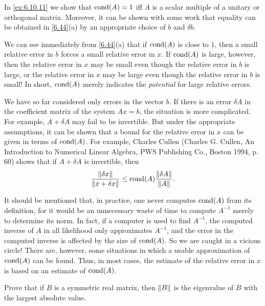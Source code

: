 \begin{note}
  In \cref{ex:6.10.11} we show that \(\cond{A} = 1\) iff \(A\) is a scalar multiple of a unitary or orthogonal matrix.
  Moreover, it can be shown with some work that equality can be obtained in \cref{6.44}(a) by an appropriate choice of \(b\) and \(\delta b\).

  We can see immediately from \cref{6.44}(a) that if \(\cond{A}\) is close to \(1\), then a small relative error in \(b\) forces a small relative error in \(x\).
  If \(\cond{A}\) is large, however, then the relative error in \(x\) may be small even though the relative error in \(b\) is large, or the relative error in \(x\) may be large even though the relative error in \(b\) is small!
  In short, \(\cond{A}\) merely indicates the \emph{potential} for large relative errors.

  We have so far considered only errors in the vector \(b\).
  If there is an error \(\delta A\) in the coefficient matrix of the system \(Ax = b\), the situation is more complicated.
  For example, \(A + \delta A\) may fail to be invertible.
  But under the appropriate assumptions, it can be shown that a bound for the relative error in \(x\) can be given in terms of \(\cond{A}\).
  For example, Charles Cullen (Charles G. Cullen, An Introduction to Numerical Linear Algebra, PWS Publishing Co., Boston 1994, p. 60) shows that if \(A + \delta A\) is invertible, then
  \[
    \dfrac{\norm{\delta x}}{\norm{x + \delta x}} \leq \cond{A} \dfrac{\norm{\delta A}}{\norm{A}}.
  \]

  It should be mentioned that, in practice, one never computes \(\cond{A}\) from its definition, for it would be an unnecessary waste of time to compute \(A^{-1}\) merely to determine its norm.
  In fact, if a computer is used to find \(A^{-1}\), the computed inverse of \(A\) in all likelihood only approximates \(A^{-1}\), and the error in the computed inverse is affected by the size of \(\cond{A}\).
  So we are caught in a vicious circle!
  There are, however, some situations in which a usable approximation of \(\cond{A}\) can be found.
  Thus, in most cases, the estimate of the relative error in \(x\) is based on an estimate of \(\cond{A}\).
\end{note}

\exercisesection

\setcounter{ex}{2}
\begin{ex}\label{ex:6.10.3}
  Prove that if \(B\) is a symmetric real matrix, then \(\left\lVert B\right\rVert\) is the eigenvalue of \(B\) with the largest absolute value.
\end{ex}

